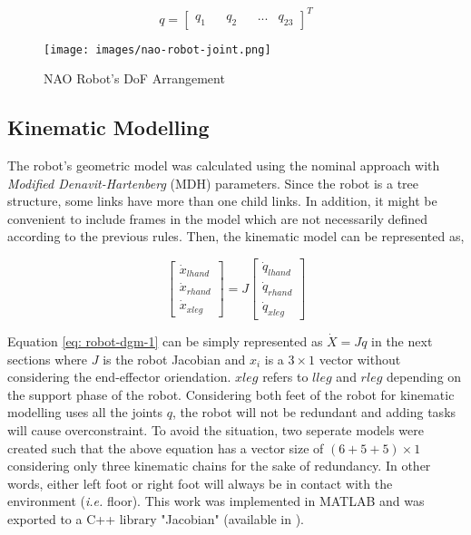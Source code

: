 \begin{equation*}
    q = \begin{bmatrix}
        q_1 && q_2 && ... & q_{23}
    \end{bmatrix}^T
\end{equation*}
\begin{figure}[h!]
    \centering
    \texttt{[image: images/nao-robot-joint.png]}\hfill
    \caption{NAO Robot's DoF Arrangement \cite{louisepouble}}\hfill
    \label{fig: nao-robot-joint}
\end{figure}

\subsection{Kinematic Modelling}

The robot's geometric model was calculated using the nominal approach with \textit{Modified Denavit-Hartenberg} (MDH) parameters. Since the 
robot is a tree structure, some links have more than one child links. In addition, it might be convenient to include 
frames in the model which are not necessarily defined according to the previous rules. Then, the kinematic model can be represented as,

\begin{equation}
    \label{eq: robot-dgm-1}
    \begin{bmatrix}
        \dot{x}_{lhand} \\ \dot{x}_{rhand} \\ \dot{x}_{xleg} 
    \end{bmatrix} = J \begin{bmatrix}
        \dot{q}_{lhand} \\ \dot{q}_{rhand} \\ \dot{q}_{xleg}
    \end{bmatrix}
\end{equation}

Equation \ref{eq: robot-dgm-1} can be simply represented as $\dot{X} = J\dot{q}$ in the next sections where $J$ is the robot Jacobian and $x_i$ is a $3 \times 1$ vector without
considering the end-effector oriendation. $xleg$ refers to $lleg$ and $rleg$ depending on the support phase of the robot. Considering both feet 
of the robot for kinematic modelling uses all the joints $q$, the robot will not be redundant and adding tasks will cause overconstraint. To avoid the situation, two seperate models
were created such that the above equation has a vector size of $(6 + 5 + 5) \times 1$ considering only three kinematic chains for the sake of redundancy. 
In other words, either left foot or right foot will always be in contact with the environment (\textit{i.e.} floor).
This work was implemented in MATLAB and was exported to a C++ library "Jacobian" (available in \cite{github}). 

